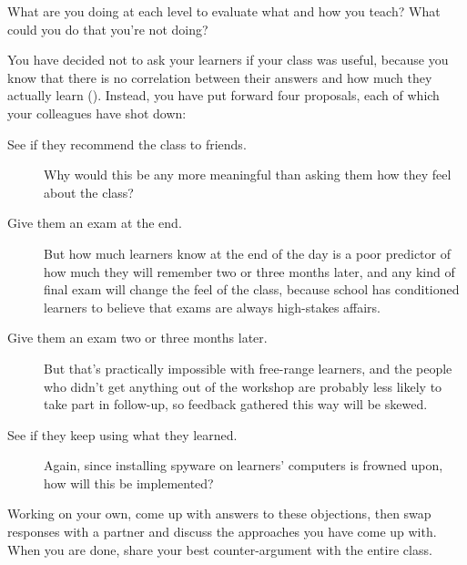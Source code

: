 What are you doing at each level to evaluate what and how you teach?
What could you do that you're not doing?


You have decided not to ask your learners if your class was useful,
because you know that there is no correlation between their answers
and how much they actually learn ().  Instead, you
have put forward four proposals, each of which your colleagues have
shot down:

\begin{description}

\item[See if they recommend the class to friends.] Why would this be
  any more meaningful than asking them how they feel about the class?

\item[Give them an exam at the end.] But how much learners know at the
  end of the day is a poor predictor of how much they will remember
  two or three months later, and any kind of final exam will change
  the feel of the class, because school has conditioned learners to
  believe that exams are always high-stakes affairs.

\item[Give them an exam two or three months later.]  But that's
  practically impossible with free-range learners, and the people who
  didn't get anything out of the workshop are probably less likely to
  take part in follow-up, so feedback gathered this way will be
  skewed.

\item[See if they keep using what they learned.] Again, since
  installing spyware on learners' computers is frowned upon, how will
  this be implemented?

\end{description}

Working on your own, come up with answers to these objections, then
swap responses with a partner and discuss the approaches you have come
up with.  When you are done, share your best counter-argument with the
entire class.
